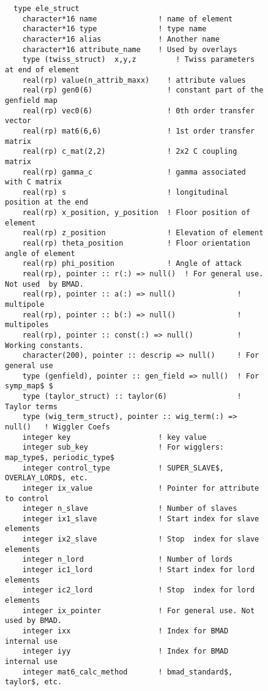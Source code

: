 \begin{figure}[tb]
\centering
\small
\begin{verbatim}
  type ele_struct
    character*16 name              ! name of element
    character*16 type              ! type name 
    character*16 alias             ! Another name
    character*16 attribute_name    ! Used by overlays
    type (twiss_struct)  x,y,z         ! Twiss parameters at end of element
    real(rp) value(n_attrib_maxx)    ! attribute values
    real(rp) gen0(6)                 ! constant part of the genfield map
    real(rp) vec0(6)                 ! 0th order transfer vector
    real(rp) mat6(6,6)               ! 1st order transfer matrix
    real(rp) c_mat(2,2)              ! 2x2 C coupling matrix
    real(rp) gamma_c                 ! gamma associated with C matrix
    real(rp) s                       ! longitudinal position at the end
    real(rp) x_position, y_position  ! Floor position of element
    real(rp) z_position              ! Elevation of element
    real(rp) theta_position          ! Floor orientation angle of element
    real(rp) phi_position            ! Angle of attack
    real(rp), pointer :: r(:) => null()  ! For general use. Not used  by BMAD.
    real(rp), pointer :: a(:) => null()              ! multipole
    real(rp), pointer :: b(:) => null()              ! multipoles
    real(rp), pointer :: const(:) => null()          ! Working constants.
    character(200), pointer :: descrip => null()     ! For general use
    type (genfield), pointer :: gen_field => null()  ! For symp_map$ $
    type (taylor_struct) :: taylor(6)                ! Taylor terms
    type (wig_term_struct), pointer :: wig_term(:) => null()   ! Wiggler Coefs
    integer key                    ! key value
    integer sub_key                ! For wigglers: map_type$, periodic_type$
    integer control_type           ! SUPER_SLAVE$, OVERLAY_LORD$, etc.
    integer ix_value               ! Pointer for attribute to control
    integer n_slave                ! Number of slaves
    integer ix1_slave              ! Start index for slave elements
    integer ix2_slave              ! Stop  index for slave elements
    integer n_lord                 ! Number of lords
    integer ic1_lord               ! Start index for lord elements
    integer ic2_lord               ! Stop  index for lord elements
    integer ix_pointer             ! For general use. Not used by BMAD.
    integer ixx                    ! Index for BMAD internal use
    integer iyy                    ! Index for BMAD internal use
    integer mat6_calc_method       ! bmad_standard$, taylor$, etc.

\end{verbatim}
\end{figure}
